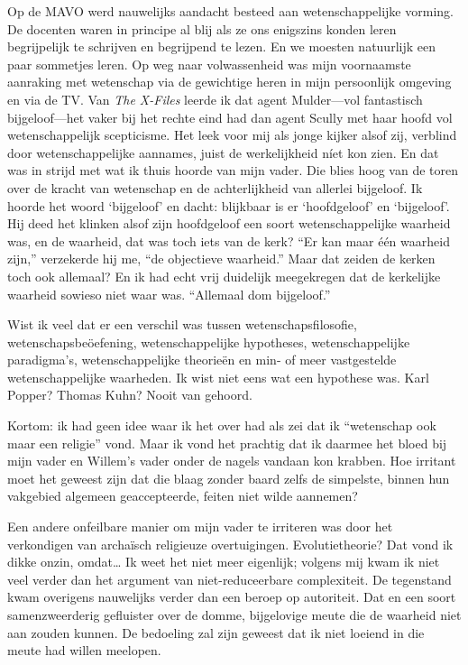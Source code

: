 \documentclass[12pt,a4paper]{article}
\begin{document}
Op de MAVO werd nauwelijks aandacht besteed aan wetenschappelijke vorming. De docenten waren in principe al blij als ze ons enigszins konden leren begrijpelijk te schrijven en begrijpend te lezen. En we moesten natuurlijk een paar sommetjes leren. Op weg naar volwassenheid was mijn voornaamste aanraking met wetenschap via de gewichtige heren in mijn persoonlijk omgeving en via de TV. Van \emph{The X-Files} leerde ik dat agent Mulder—vol fantastisch bijgeloof—het vaker bij het rechte eind had dan agent Scully met haar hoofd vol wetenschappelijk scepticisme. Het leek voor mij als jonge kijker alsof zij, verblind door wetenschappelijke aannames, juist de werkelijkheid níet kon zien. En dat was in strijd met wat ik thuis hoorde van mijn vader. Die blies hoog van de toren over de kracht van wetenschap en de achterlijkheid van allerlei bijgeloof. Ik hoorde het woord ‘bijgeloof’ en dacht: blijkbaar is er ‘hoofdgeloof’ en ‘bijgeloof’. Hij deed het klinken alsof zijn hoofdgeloof een soort wetenschappelijke waarheid was, en de waarheid, dat was toch iets van de kerk? “Er kan maar één waarheid zijn,” verzekerde hij me, “de objectieve waarheid.” Maar dat zeiden de kerken toch ook allemaal? En ik had echt vrij duidelijk meegekregen dat de kerkelijke waarheid sowieso niet waar was. “Allemaal dom bijgeloof.”

Wist ik veel dat er een verschil was tussen wetenschapsfilosofie, weten\-schaps\-beöef\-ening, wetenschappelijke hypotheses, wetenschappelijke paradigma's, wetenschappelijke theorieën en min- of meer vastgestelde wetenschappelijke waarheden. Ik wist niet eens wat een hypothese was. Karl Popper? Thomas Kuhn? Nooit van gehoord.

Kortom: ik had geen idee waar ik het over had als zei dat ik “wetenschap ook maar een religie” vond. Maar ik vond het prachtig dat ik daarmee het bloed bij mijn vader en Willem's vader onder de nagels vandaan kon krabben. Hoe irritant moet het geweest zijn dat die blaag zonder baard zelfs de simpelste, binnen hun vakgebied algemeen geaccepteerde, feiten niet wilde aannemen?

Een andere onfeilbare manier om mijn vader te irriteren was door het verkondigen van archaïsch religieuze overtuigingen. Evolutietheorie? Dat vond ik dikke onzin, omdat… Ik weet het niet meer eigenlijk; volgens mij kwam ik niet veel verder dan het argument van niet-reduceerbare complexiteit. De tegenstand kwam overigens nauwelijks verder dan een beroep op autoriteit. Dat en een soort samenzweerderig gefluister over de domme, bijgelovige meute die de waarheid niet aan zouden kunnen. De bedoeling zal zijn geweest dat ik niet loeiend in die meute had willen meelopen.
\end{document}
